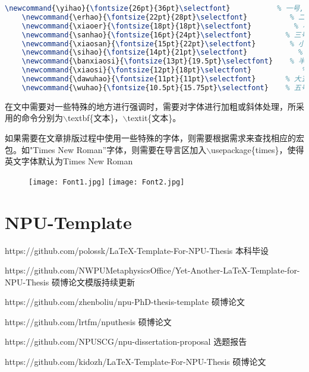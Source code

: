 \documentclass[cn,10pt,math=newtx,citestyle=gb7714-2015,bibstyle=gb7714-2015]{elegantbook}
\begin{document}
\begin{lstlisting}[language=tex]
	\newcommand{\yihao}{\fontsize{26pt}{36pt}\selectfont}           % 一号, 1.4 倍行距
	\newcommand{\erhao}{\fontsize{22pt}{28pt}\selectfont}          % 二号, 1.25倍行距
	\newcommand{\xiaoer}{\fontsize{18pt}{18pt}\selectfont}          % 小二, 单倍行距
	\newcommand{\sanhao}{\fontsize{16pt}{24pt}\selectfont}        % 三号, 1.5倍行距
	\newcommand{\xiaosan}{\fontsize{15pt}{22pt}\selectfont}        % 小三, 1.5倍行距
	\newcommand{\sihao}{\fontsize{14pt}{21pt}\selectfont}            % 四号, 1.5 倍行距
	\newcommand{\banxiaosi}{\fontsize{13pt}{19.5pt}\selectfont}    % 半小四, 1.5倍行距
	\newcommand{\xiaosi}{\fontsize{12pt}{18pt}\selectfont}            % 小四, 1.5倍行距
	\newcommand{\dawuhao}{\fontsize{11pt}{11pt}\selectfont}       % 大五号, 单倍行距
	\newcommand{\wuhao}{\fontsize{10.5pt}{15.75pt}\selectfont}    % 五号, 单倍行距
\end{lstlisting}

在文中需要对一些特殊的地方进行强调时，需要对字体进行加粗或斜体处理，所采用的命令分别为$\backslash$textbf\{文本\}，$\backslash$textit\{文本\}。


如果需要在文章排版过程中使用一些特殊的字体，则需要根据需求来查找相应的宏包。如"Times New Roman”字体，则需要在导言区加入$\backslash$usepackage\{times\}，使得英文字体默认为Times New Roman

\begin{figure}
\centering
\texttt{[image: Font1.jpg]}
\texttt{[image: Font2.jpg]}
\end{figure}

\section*{NPU-Template}

https://github.com/polossk/LaTeX-Template-For-NPU-Thesis 本科毕设

https://github.com/NWPUMetaphysicsOffice/Yet-Another-LaTeX-Template-for-NPU-Thesis 硕博论文模版持续更新

https://github.com/zhenboliu/npu-PhD-thesis-template  硕博论文

https://github.com/lrtfm/nputhesis  硕博论文

https://github.com/NPUSCG/npu-dissertation-proposal 选题报告

https://github.com/kidozh/LaTeX-Template-For-NPU-Thesis  硕博论文
\end{document}
